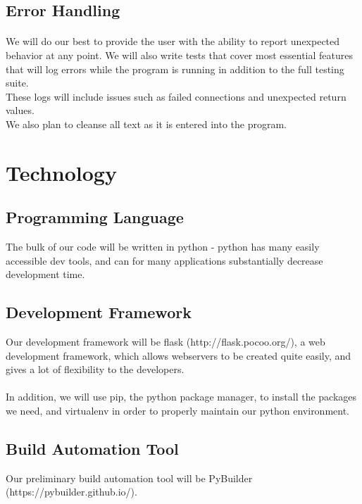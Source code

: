 \documentclass{article}
\begin{document}
\begin{center}

\end{center}

\pagebreak
\subsection{Error Handling}

\paragraph{}

We will do our best to provide the user with the ability to report unexpected behavior at any point. We will also write tests that cover most essential features that will log errors while the program is running in addition to the full testing suite.\\

These logs will include issues such as failed connections and unexpected return values.\\

We also plan to cleanse all text as it is entered into the program.

\section{Technology}

\subsection{Programming Language}
The bulk of our code will be written in python - python has many easily accessible dev tools, and can for many applications substantially decrease development time. 
\subsection{Development Framework}
Our development framework will be flask (http://flask.pocoo.org/), a web development framework, which allows webservers to be created quite easily, and gives a lot of flexibility to the developers. \\
\\
In addition, we will use pip, the python package manager, to install the packages we need, and virtualenv in order to properly maintain our python environment. 
\subsection{Build Automation Tool}
Our preliminary build automation tool will be PyBuilder (https://pybuilder.github.io/).
\end{document}

